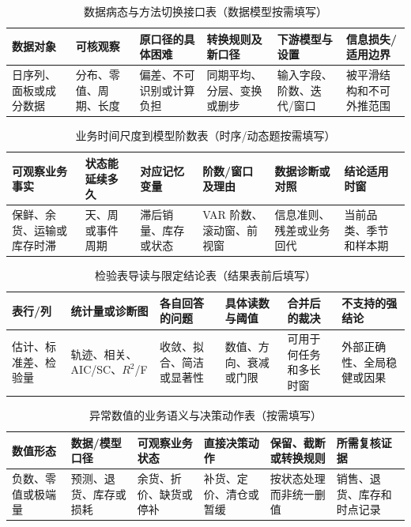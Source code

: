 \documentclass[withoutpreface,bwprint]{cumcmthesis}
\begin{document}
  \begin{table}[H]
    \centering
    \small
    \setlength{\tabcolsep}{3.2pt}
    \caption{数据病态与方法切换接口表（数据模型按需填写）}
    \label{tab:data-pathology-route-guide}
    \begin{tabular}{p{1.7cm}p{2.15cm}p{2.2cm}p{2.2cm}p{2.25cm}p{2.25cm}}
      \toprule
      数据对象 & 可核观察 & 原口径的具体困难 & 转换规则及新口径 & 下游模型与设置 & 信息损失/适用边界 \\
      \midrule
      日序列、面板或成分数据 & 分布、零值、周期、长度 & 偏差、不可识别或计算负担 & 同期平均、分层、变换或删步 & 输入字段、阶数、迭代/窗口 & 被平滑结构和不可外推范围 \\
      \bottomrule
    \end{tabular}
  \end{table}
  \begin{table}[H]
    \centering
    \small
    \setlength{\tabcolsep}{3.2pt}
    \caption{业务时间尺度到模型阶数表（时序/动态题按需填写）}
    \label{tab:business-memory-model-order-guide}
    \begin{tabular}{p{2.05cm}p{2.2cm}p{2.05cm}p{2.1cm}p{2.3cm}p{2.25cm}}
      \toprule
      可观察业务事实 & 状态能延续多久 & 对应记忆变量 & 阶数/窗口及理由 & 数据诊断或对照 & 结论适用时窗 \\
      \midrule
      保鲜、余货、运输或库存时滞 & 天、周或事件周期 & 滞后销量、库存或状态 & VAR 阶数、滚动窗、前视窗 & 信息准则、残差或业务回代 & 当前品类、季节和样本期 \\
      \bottomrule
    \end{tabular}
  \end{table}
  \begin{table}[H]
    \centering
    \small
    \setlength{\tabcolsep}{3.2pt}
    \caption{检验表导读与限定结论表（结果表前后填写）}
    \label{tab:diagnostic-table-reading-guide}
    \begin{tabular}{p{1.7cm}p{2.15cm}p{2.0cm}p{2.3cm}p{2.35cm}p{2.45cm}}
      \toprule
      表行/列 & 统计量或诊断图 & 各自回答的问题 & 具体读数与阈值 & 合并后的裁决 & 不支持的强结论 \\
      \midrule
      估计、标准差、检验量 & 轨迹、相关、AIC/SC、$R^2$/F & 收敛、拟合、简洁或显著性 & 数值、方向、衰减或门限 & 可用于何任务和多长时窗 & 外部正确性、全局稳健或因果 \\
      \bottomrule
    \end{tabular}
  \end{table}
  \begin{table}[H]
    \centering
    \small
    \setlength{\tabcolsep}{3.2pt}
    \caption{异常数值的业务语义与决策动作表（按需填写）}
    \label{tab:numeric-business-semantics-guide}
    \begin{tabular}{p{1.75cm}p{2.1cm}p{2.4cm}p{2.2cm}p{2.4cm}p{2.3cm}}
      \toprule
      数值形态 & 数据/模型口径 & 可观察业务状态 & 直接决策动作 & 保留、截断或转换规则 & 所需复核证据 \\
      \midrule
      负数、零值或极端量 & 预测、退货、库存或损耗 & 余货、折价、缺货或停补 & 补货、定价、清仓或暂缓 & 按状态处理而非统一删值 & 销售、退货、库存和时点记录 \\
      \bottomrule
    \end{tabular}
  \end{table}
\end{document}
